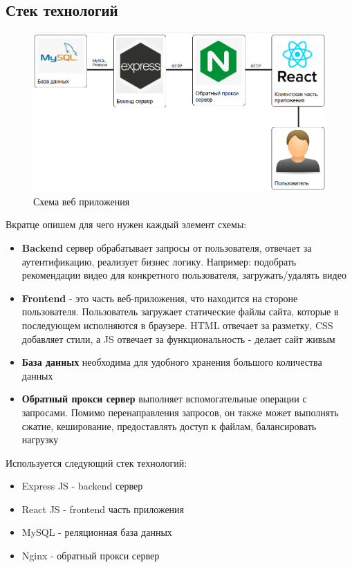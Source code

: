 \documentclass[12pt]{article}
\begin{document}
\subsection{Стек технологий}

\begin{figure}[H]
    \centering
    \includegraphics[width=1\textwidth]{../images/Схема_веб-приложения.png}
    \caption{Схема веб приложения}
\end{figure}

Вкратце опишем для чего нужен каждый элемент схемы:

\begin{itemize}
    \item \textbf{Backend} сервер обрабатывает запросы от пользователя, отвечает за аутентификацию,
          реализует бизнес логику. Например: подобрать рекомендации видео для конкретного пользователя, загружать/удалять видео
    \item \textbf{Frontend} - это часть веб-приложения, что находится на стороне пользователя.
          Пользователь загружает статические файлы сайта, которые в последующем исполняются в браузере.
          HTML отвечает за разметку, CSS добавляет стили, а JS отвечает за функциональность - делает сайт живым
    \item \textbf{База данных} необходима для удобного хранения большого количества данных
    \item \textbf{Обратный прокси сервер} выполняет вспомогательные операции с запросами.
          Помимо перенаправления запросов, он также может выполнять сжатие, кеширование, предоставлять доступ к файлам,
          балансировать нагрузку
\end{itemize}

Используется следующий стек технологий:

\begin{itemize}
    \item Express JS - backend сервер
    \item React JS - frontend часть приложения
    \item MySQL - реляционная база данных
    \item Nginx - обратный прокси сервер
\end{itemize}
\end{document}
